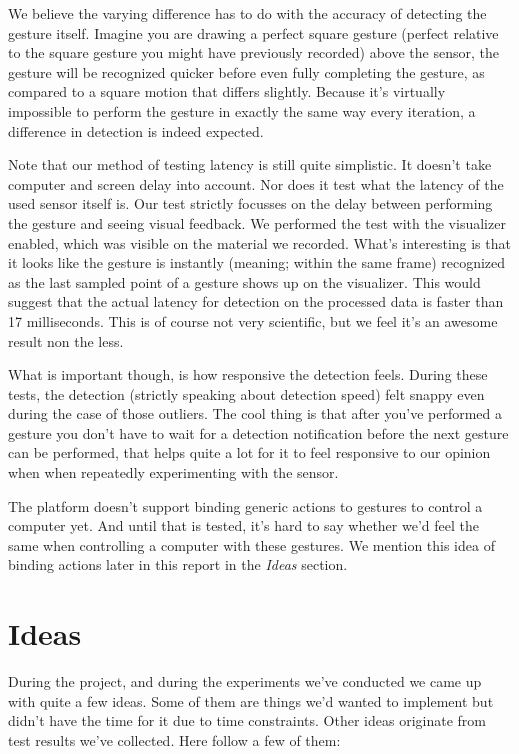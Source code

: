 \documentclass[a4paper]{article}
\begin{document}
  We believe the varying difference has to do with the accuracy of detecting the
  gesture itself. Imagine you are drawing a perfect square gesture (perfect
  relative to the square gesture you might have previously recorded) above the
  sensor, the gesture will be recognized quicker before even fully completing
  the gesture, as compared to a square motion that differs slightly. Because
  it's virtually impossible to perform the gesture in exactly the same way every
  iteration, a difference in detection is indeed expected.

  Note that our method of testing latency is still quite simplistic. It doesn't
  take computer and screen delay into account. Nor does it test what the latency
  of the used sensor itself is. Our test strictly focusses on the delay between
  performing the gesture and seeing visual feedback. We performed the test with
  the visualizer enabled, which was visible on the material we recorded. What's
  interesting is that it looks like the gesture is instantly (meaning; within
  the same frame) recognized as the last sampled point of a gesture shows up on
  the visualizer. This would suggest that the actual latency for detection on
  the processed data is faster than 17 milliseconds. This is of course not very
  scientific, but we feel it's an awesome result non the less.

  What is important though, is how responsive the detection feels. During these
  tests, the detection (strictly speaking about detection speed) felt snappy even
  during the case of those outliers. The cool thing is that after you've
  performed a gesture you don't have to wait for a detection notification before
  the next gesture can be performed, that helps quite a lot for it to feel
  responsive to our opinion when when repeatedly experimenting with the sensor.

  The platform doesn't support binding
  generic actions to gestures to control a computer yet. And until that is
  tested, it's hard to say whether we'd feel the same when controlling a
  computer with these gestures. We mention this idea of binding actions later in
  this report in the \emph{Ideas} section.

  \clearpage

  \section{Ideas}
  During the project, and during the experiments we've conducted we came up with
  quite a few ideas. Some of them are things we'd wanted to implement but didn't
  have the time for it due to time constraints. Other ideas originate from
  test results we've collected.
  Here follow a few of them:
\end{document}
